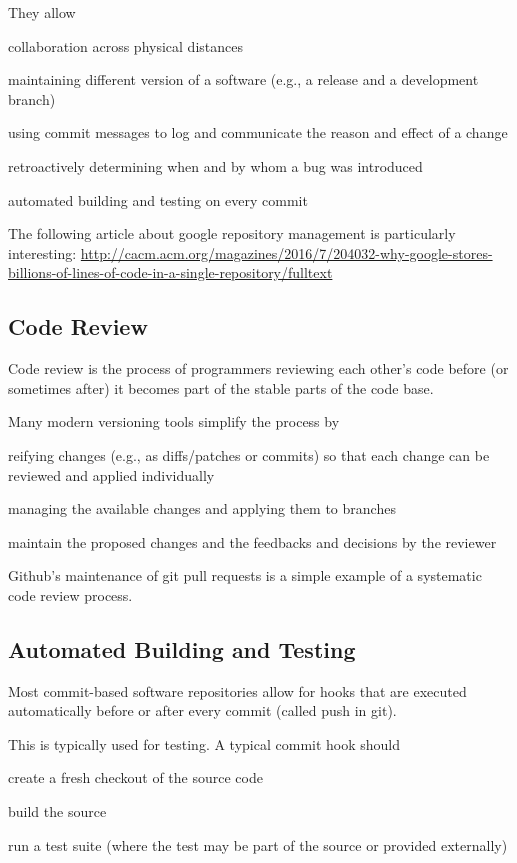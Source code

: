 They allow
\begin{compactitem}
 \item collaboration across physical distances
 \item maintaining different version of a software (e.g., a release and a development branch)
 \item using commit messages to log and communicate the reason and effect of a change
 \item retroactively determining when and by whom a bug was introduced
 \item automated building and testing on every commit
\end{compactitem}

The following article about google repository management is particularly interesting:
\url{http://cacm.acm.org/magazines/2016/7/204032-why-google-stores-billions-of-lines-of-code-in-a-single-repository/fulltext}

\subsection{Code Review}

Code review is the process of programmers reviewing each other's code before (or sometimes after) it becomes part of the stable parts of the code base.

Many modern versioning tools simplify the process by
\begin{compactitem}
 \item reifying changes (e.g., as diffs/patches or commits) so that each change can be reviewed and applied individually
 \item managing the available changes and applying them to branches
 \item maintain the proposed changes and the feedbacks and decisions by the reviewer
\end{compactitem}

Github's maintenance of git pull requests is a simple example of a systematic code review process.

\subsection{Automated Building and Testing}

Most commit-based software repositories allow for hooks that are executed automatically before or after every commit (called push in git).

This is typically used for testing.
A typical commit hook should
\begin{compactitem}
 \item create a fresh checkout of the source code
 \item build the source
 \item run a test suite (where the test may be part of the source or provided externally)
\end{compactitem}

